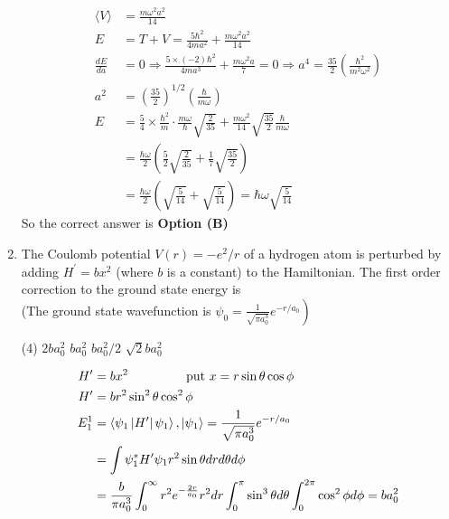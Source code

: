 \begin{enumerate}
\begin{answer}
\begin{align*}
\langle V\rangle&=\frac{m \omega^{2} a^{2}}{14}\\
E&=T+V=\frac{5 \hbar^{2}}{4 m a^{2}}+\frac{m \omega^{2} a^{2}}{14}\\
\frac{d E}{d a}&=0 \Rightarrow \frac{5 \times(-2) \hbar^{2}}{4 m a^{3}}+\frac{m \omega^{2} a}{7}=0 \Rightarrow a^{4}=\frac{35}{2}\left(\frac{\hbar^{2}}{m^{2} \omega^{2}}\right)\\
a^{2}&=\left(\frac{35}{2}\right)^{1 / 2}\left(\frac{\hbar}{m \omega}\right)\\
E&=\frac{5}{4} \times \frac{\hbar^{2}}{m} \cdot \frac{m \omega}{\hbar} \sqrt{\frac{2}{35}}+\frac{m \omega^{2}}{14} \sqrt{\frac{35}{2}} \frac{\hbar}{m \omega}\\
&=\frac{\hbar \omega}{2}\left(\frac{5}{2} \sqrt{\frac{2}{35}}+\frac{1}{7} \sqrt{\frac{35}{2}}\right)\\&=\frac{\hbar \omega}{2}\left(\sqrt{\frac{5}{14}}+\sqrt{\frac{5}{14}}\right)=\hbar \omega \sqrt{\frac{5}{14}}
\end{align*}
So the correct answer is \textbf{Option (B)}
\end{answer}
\item  The Coulomb potential $V(r)=-e^{2} / r$ of a hydrogen atom is perturbed by adding $H^{\prime}=b x^{2}$ (where $b$ is a constant) to the Hamiltonian. The first order correction to the ground state energy is\\
(The ground state wavefunction is $\left.\psi_{0}=\frac{1}{\sqrt{\pi a_{0}^{3}}} e^{-r / a_{0}}\right)$
{}
\begin{tasks}(4)
\task[\textbf{A.}] $2 b a_{0}^{2}$
\task[\textbf{B.}] $b a_{0}^{2}$
\task[\textbf{C.}] $b a_{0}^{2} / 2$
\task[\textbf{D.}] $\sqrt{2} b a_{0}^{2}$
\end{tasks}
\begin{answer}
\begin{align*}
H^{\prime}&=b x^{2} \hspace{1.5cm}\text{ put }x=r \sin \theta \cos \phi\\
H^{\prime}&=b r^{2} \sin ^{2} \theta \cos ^{2} \phi\\
E_{1}^{1}&=\left\langle\psi_{1}\left|H^{\prime}\right| \psi_{1}\right\rangle,\left|\psi_{1}\right\rangle=\frac{1}{\sqrt{\pi a_{0}^{3}}} e^{-r / a_{0}}\\
&=\int \psi_{1}^{*} H^{\prime} \psi_{1} r^{2} \sin \theta d r d \theta d \phi\\
&=\frac{b}{\pi a_{0}^{3}} \int_{0}^{\infty} r^{2} e^{-\frac{2 r}{a_{0}}} r^{2} d r \int_{0}^{\pi} \sin ^{3} \theta d \theta \int_{0}^{2 \pi} \cos ^{2} \phi d \phi=b a_{0}^{2}

\end{align*}
\end{answer}
\end{enumerate}
